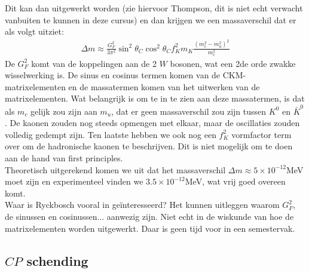 \documentclass[../main.tex]{subfiles}
\begin{document}
Dit kan dan uitgewerkt worden (zie hiervoor Thompson, dit is niet echt verwacht vanbuiten te kunnen in deze cursus) en dan krijgen we een massaverschil dat er als volgt uitziet:
\begin{equation}
    \begin{aligned}
        \label{eq:kaon_osc_massaverschil}
        \Delta m \approx \frac{G_{F}^{2}}{3 \pi^{2}} \sin ^{2} \theta_{C} \cos ^{2} \theta_{C} f_{K}^{2} m_{K} \frac{\left(m_{c}^{2}-m_{u}^{2}\right)^{2}}{m_{c}^{2}}
    \end{aligned}
\end{equation}
De $G_F^2$ komt van de koppelingen aan de 2 $W$ bosonen, wat een 2de orde zwakke wisselwerking is. De sinus en cosinus termen komen van de CKM-matrixelementen en de massatermen komen van het uitwerken van de matrixelementen. Wat belangrijk is om te in te zien aan deze massatermen, is dat als $m_c$ gelijk zou zijn aan $m_u$, dat er geen massaverschil zou zijn tussen $K^0$ en $\bar{K}^0$. De kaonen zouden nog steeds opmengen met elkaar, maar de oscillaties zouden volledig gedempt zijn. Ten laatste hebben we ook nog een $f_K^2$ vormfactor term over om de hadronische kaonen te beschrijven. Dit is niet mogelijk om te doen aan de hand van first principles.\\
Theoretisch uitgerekend komen we uit dat het massaverschil $\Delta m \approx 5 \times 10^{-12}$MeV moet zijn en experimenteel vinden we $3.5 \times 10^{-12}$MeV, wat vrij goed overeen komt.\\
{\color{red} Waar is Ryckbosch vooral in geïnteresseerd? Het kunnen uitleggen waarom $G_F^2$, de sinussen en cosinussen... aanwezig zijn. Niet echt in de wiskunde van hoe de matrixelementen worden uitgewerkt. Daar is geen tijd voor in een semestervak.}\\

\subsection{$CP$ schending}%
\label{sub:_cp_schending}
\end{document}
